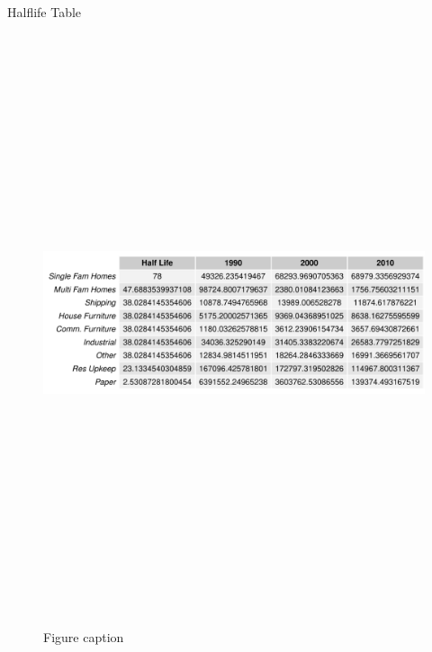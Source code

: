 \documentclass[final]{beamer}\usepackage[]{graphicx}\usepackage[]{color}
\newlength{\onecolwid}
\newlength{\twocolwid}
\begin{document}
\begin{frame}[t]
\begin{columns}[t]
\begin{column}{\twocolwid}
\begin{columns}[t,totalwidth=\twocolwid]
\begin{column}{\onecolwid}




\begin{block}{Halflife Table}
\begin{center}
\begin{figure}
{\includegraphics[width=1\linewidth, height=17cm]{CopyOfHLTable.pdf}}
      \caption{Figure caption}
  \end{figure}
  \end{center}
  \end{block}


\end{column}
\end{columns}
\end{column}
\end{columns}
\end{frame}
\end{document}
